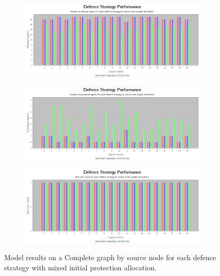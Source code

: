 \documentclass[results.tex]{subfiles}
\begin{document}
\begin{figure}[!ht]
\centering
     \begin{subfigure}[b]{0.9\textwidth}
         \centering
         \includegraphics[width=\textwidth]{Random/RandomInfectedChart}
         \label{fig:com-ran-infected}
     \end{subfigure}
     \vfill
     \begin{subfigure}[b]{0.9\textwidth}
         \centering
         \includegraphics[width=\textwidth]{Random/RandomProtectedChart}
         \label{fig:com-ran-protected}
     \end{subfigure}
     \vfill
     \begin{subfigure}[b]{0.9\textwidth}
         \centering
         \includegraphics[width=\textwidth]{Random/RandomEndTurnChart}
         \label{fig:com-ran-end}
     \end{subfigure}
        \caption{Model results on a Complete graph by source node for each defence strategy with mixed initial protection allocation.}
        \label{fig:com-ran-charts}
\end{figure}
\end{document}
